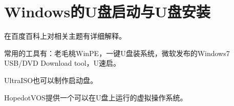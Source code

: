 \section{Windows的U盘启动与U盘安装}
在百度百科上对相关主题有详细解释。

常用的工具有：老毛桃WinPE，一键U盘装系统，微软发布的Windows7 USB/DVD Download tool，U速启。

UltraISO也可以制作启动盘。 

HopedotVOS提供一个可以在U盘上运行的虚拟操作系统。
